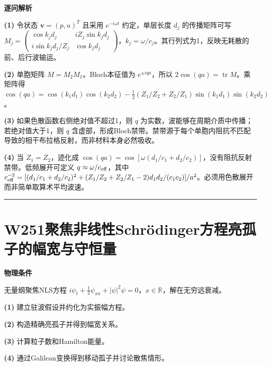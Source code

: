 \documentclass[UTF8,a4paper,11pt,oneside,openany]{ctexbook}
\begin{document}
\par\medskip\noindent\textbf{逐问解析}
\par\noindent\textbf{(1)} 令状态 \(\boldsymbol v=(p,u)^T\) 且采用 \(e^{-i\omega t}\) 约定，单层长度 \(d_j\) 的传播矩阵可写 \(M_j=\begin{pmatrix}\cos k_jd_j&iZ_j\sin k_jd_j\\i\sin k_jd_j/Z_j&\cos k_jd_j\end{pmatrix}\)，\(k_j=\omega/c_j\)。其行列式为1，反映无耗散的前、后行波输运。
\par\noindent\textbf{(2)} 单胞矩阵 \(M=M_2M_1\)。Bloch本征值为 \(e^{\pm iqa}\)，所以 \(2\cos(qa)=\operatorname{tr}M\)。乘矩阵得 \(\cos(qa)=\cos(k_1d_1)\cos(k_2d_2)-\frac12(Z_1/Z_2+Z_2/Z_1)\sin(k_1d_1)\sin(k_2d_2)\)。
\par\noindent\textbf{(3)} 如果色散函数右侧绝对值不超过1，则 \(q\) 为实数，波能够在周期介质中传播；若绝对值大于1，则 \(q\) 含虚部，形成Bloch禁带。禁带源于每个单胞内阻抗不匹配导致的相干布拉格反射，而非材料本身必然吸收。
\par\noindent\textbf{(4)} 当 \(Z_1=Z_2\)，迹化成 \(\cos(qa)=\cos[\omega(d_1/c_1+d_2/c_2)]\)，没有阻抗反射禁带。低频展开可定义 \(q\approx\omega/c_{\rm eff}\)，其中 \(c_{\rm eff}^{-2}=[(d_1/c_1+d_2/c_2)^2+(Z_1/Z_2+Z_2/Z_1-2)d_1d_2/(c_1c_2)]/a^2\)。必须用色散展开而非简单取算术平均波速。

\par\bigskip\hrule\bigskip
\section*{W251\quad 聚焦非线性Schrödinger方程亮孤子的幅宽与守恒量}
\textbf{物理条件}\par 无量纲聚焦NLS方程 \(i\psi_t+\tfrac12\psi_{xx}+|\psi|^2\psi=0\)，\(x\in\mathbb R\)，解在无穷远衰减。
\par\noindent\textbf{(1)} 建立驻波假设并约化为实振幅方程。
\par\noindent\textbf{(2)} 构造精确亮孤子并得到幅宽关系。
\par\noindent\textbf{(3)} 计算粒子数和Hamilton能量。
\par\noindent\textbf{(4)} 通过Galilean变换得到移动孤子并讨论散焦情形。
\end{document}
